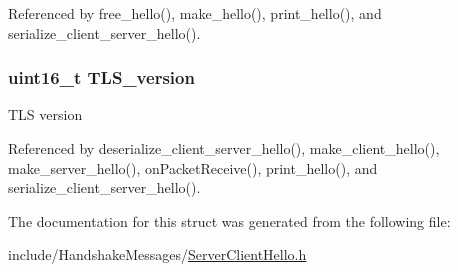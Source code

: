 Referenced by free\+\_\+hello(), make\+\_\+hello(), print\+\_\+hello(), and serialize\+\_\+client\+\_\+server\+\_\+hello().

\subsubsection[{\texorpdfstring{T\+L\+S\+\_\+version}{TLS_version}}]{\setlength{\rightskip}{0pt plus 5cm}uint16\+\_\+t {\bf T\+L\+S\+\_\+version}}\hypertarget{structserver__client__hello__t_a5b4305b976c657bb4a056e00aeadb8ef}{}\label{structserver__client__hello__t_a5b4305b976c657bb4a056e00aeadb8ef}
T\+LS version 

Referenced by deserialize\+\_\+client\+\_\+server\+\_\+hello(), make\+\_\+client\+\_\+hello(), make\+\_\+server\+\_\+hello(), on\+Packet\+Receive(), print\+\_\+hello(), and serialize\+\_\+client\+\_\+server\+\_\+hello().



The documentation for this struct was generated from the following file\+:\begin{DoxyCompactItemize}
\item 
include/\+Handshake\+Messages/\hyperlink{_server_client_hello_8h}{Server\+Client\+Hello.\+h}\end{DoxyCompactItemize}
